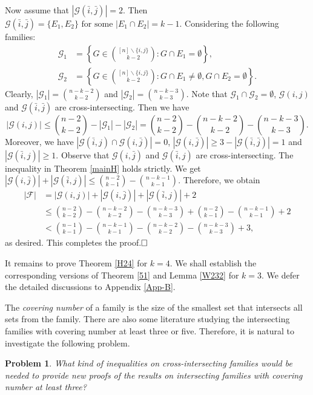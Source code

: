 \documentclass[11pt]{article}
\numberwithin{equation}{section}
\newtheorem{problem}[theorem]{Problem}
\begin{document}
Now assume that  $|\mathcal{G}(\bar{i},\bar{j})|=2$. Then
$\mathcal{G}(\bar{i},\bar{j})= \{E_1, E_2\} \text{ for some } |E_1\cap E_2|=k-1$.
Considering the following families:
\begin{align*}
\mathcal{G}_1 &=\left\{G \in\binom{[n]\backslash \{i,j\}}{k-2}: G \cap E_1=\emptyset \right\}, \\ 
\mathcal{G}_2&=\left\{G \in\binom{[n]\backslash \{i,j\}}{k-2}: G \cap E_1 \neq \emptyset, G \cap E_2=\emptyset\right\}.
\end{align*}
 Clearly, $|\mathcal{G}_1|=\binom{n-k-2}{k-2}$ and $|\mathcal{G}_2|=\binom{n-k-3}{k-3}$.
Note that $\mathcal{G}_1\cap \mathcal{G}_{2}=\emptyset$, $\mathcal{G}(i,j)$ and $\mathcal{G}(\bar{i},\bar{j})$ are cross-intersecting. Then we have
$$
|\mathcal{G}(i,j)|\leq \binom{n-2}{k-2}-|\mathcal{G}_1|-|\mathcal{G}_2|=\binom{n-2}{k-2}-\binom{n-k-2}{k-2}-\binom{n-k-3}{k-3}.
$$
Moreover, we have $|\mathcal{G}(\bar{i},j)\cap \mathcal{G}(i,\bar{j})|=0$, $|\mathcal{G}(i,\bar{j})|\geq 3-|\mathcal{G}(\bar{i},\bar{j})|=1$ and $|\mathcal{G}(\bar{i},j)|\geq 1$.
Observe that $\mathcal{G}(i,\bar{j})$ and $\mathcal{G}(\bar{i},j)$ are cross-intersecting. The inequality in Theorem \ref{mainH} holds strictly. 
We get
$
|\mathcal{G}(i,\bar{j})|+|\mathcal{G}(\bar{i}, j)| \leq\binom{n-2}{k-1}-\binom{n-k-1}{k-1}.
$
Therefore, we obtain
\begin{align*}
|\mathcal{F}|&=|\mathcal{G}(i,j)|+|\mathcal{G}(i,\bar{j})|+|\mathcal{G}(\bar{i}, j)|+2\\
&\leq \binom{n-2}{k-2}-\binom{n-k-2}{k-2}-\binom{n-k-3}{k-3}+\binom{n-2}{k-1}-\binom{n-k-1}{k-1}+2\\
&<\binom{n-1}{k-1}-\binom{n-k-1}{k-1}-\binom{n-k-2}{k-2}-\binom{n-k-3}{k-3}+3,
\end{align*}
as desired. This completes the proof.$\hfill \square$\vspace{3mm}


It remains to prove Theorem \ref{H24} for $k=4$. We shall establish the corresponding versions of Theorem \ref{51} and Lemma \ref{W232} for  $k=3$. 
We defer the detailed discussions to Appendix \ref{App-B}. 


The \textit{covering number} of a family is the  size of the smallest set that intersects all sets from the family.
There are also some literature \cite{F80, FT251,FT252, K24} studying the intersecting families with covering number at least three or five. Therefore, it is natural to investigate the following problem.

\begin{problem}
  What kind of inequalities on cross-intersecting families would be needed to provide new proofs of the results on intersecting families with covering number at least three?  
\end{problem}
\end{document}
